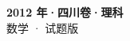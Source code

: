 \documentclass[zihao=-4, a4paper]{ctexart}
\begin{document}
\begin{center}
  {\Large\bfseries 2012 年·四川卷·理科}\\[4pt]
  {\large 数学 · 试题版}
\end{center}
\medskip
{}

\end{document}
